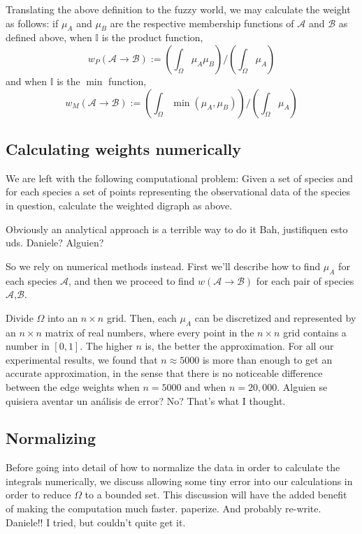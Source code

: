 \documentclass[12pt]{article}
\numberwithin{equation}{section} %
\numberwithin{figure}{section} %
\def\cA{{\mathcal{A}}}
\def\cB{{\mathcal{B}}}
\def\II{{\mathbb{I}}}
\theoremstyle{definition}
\def\tcr#1{\textcolor{MyRed}{#1}}
\begin{document}
	Translating the above definition to the fuzzy world, we may calculate the weight as follows: if $\mu_A$ and $\mu_B$ are the respective membership functions of $\cA$ and $\cB$ as defined above, when $\II$ is the product function,
	$$w_P(\cA \to \cB) := \left(\int_\Omega \mu_A\mu_B\right)\big/\left(\int_\Omega \mu_A\right) $$
	and when $\II$ is the $\min$ function,
	$$w_M(\cA \to \cB) := \left(\int_\Omega \min(\mu_A,\mu_B)\right)\big/\left(\int_\Omega \mu_A\right) $$
	
\subsection{Calculating weights numerically}

We are left with the following computational problem: Given a set of species and for each species a set of points representing the observational data of the species in question, calculate the weighted digraph as above.

Obviously an analytical approach is a terrible way to do it \tcr{Bah, justifiquen esto uds. Daniele? Alguien?}

So we rely on numerical methods instead. First we'll describe how to find $\mu_A$ for each species $\cA$, and then we proceed to find $w(\cA\to\cB)$ for each pair of species $\cA$,$\cB$.

Divide $\Omega$ into an $n\times n$ grid. Then, each $\mu_A$ can be discretized and represented by an $n\times n$ matrix of real numbers, where every point in the $n\times n$ grid contains a number in $[0,1]$. The higher $n$ is, the better the approximation. For all our experimental results, we found that $n \approx 5000$ is more than enough to get an accurate approximation, in the sense that there is no noticeable difference between the edge weights when $n = 5000$ and when $n = 20,000$. \tcr{Alguien se quisiera aventar un análisis de error? No? That's what I thought.}


\subsection{Normalizing}

	Before going into detail of how to normalize the data in order to calculate the integrals numerically, we discuss allowing some tiny error into our calculations in order to reduce $\Omega$ to a bounded set. This discussion will have the added benefit of making the computation much faster. \tcr{paperize. And probably re-write. Daniele!! I tried, but couldn't quite get it.} 
	
\end{document}
